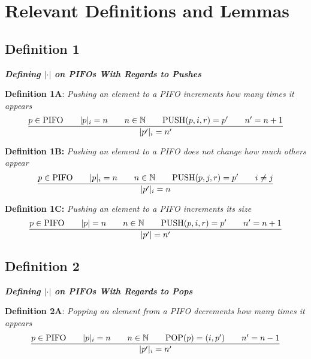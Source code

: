 \documentclass{article}
\begin{document}
\section{Relevant Definitions and Lemmas}

\subsection{Definition 1}

\noindent \textbf{\textit{Defining $|\cdot|$ on PIFOs With Regards to Pushes}}

\hfill \break 

\noindent \textbf{Definition 1A}: \textit{Pushing an element to a PIFO increments how many times it appears}
 $$\frac{p \in \text{PIFO}  \hspace{0.7cm} |p|_i = n \hspace{0.7cm} n \in \mathbb{N} \hspace{0.7cm} \text{PUSH}(p, i, r) = p' \hspace{0.7cm} n' = n+1}{|p'|_i = n'}$$

\noindent \textbf{Definition 1B:} \textit{Pushing an element to a PIFO does not change how much others appear}
$$\frac{p \in \text{PIFO}  \hspace{0.7cm} |p|_i = n \hspace{0.7cm} n \in \mathbb{N} \hspace{0.7cm} \text{PUSH}(p, j, r) = p' \hspace{0.7cm} i \neq j}{|p'|_i = n}$$

\noindent \textbf{Definition 1C:} \textit{Pushing an element to a PIFO increments its size}
$$\frac{p \in \text{PIFO}  \hspace{0.7cm} |p| = n \hspace{0.7cm} n \in \mathbb{N} \hspace{0.7cm} \text{PUSH}(p, i, r) = p' \hspace{0.7cm} n' = n+1}{|p'| = n'}$$\newline

\subsection{Definition 2}
\noindent \textbf{\textit{Defining $|\cdot|$ on PIFOs With Regards to Pops}}

\hfill\break

\noindent \textbf{Definition 2A}: \textit{Popping an element from a PIFO decrements how many times it appears}
 $$\frac{p \in \text{PIFO}  \hspace{0.7cm} |p|_i = n \hspace{0.7cm} n \in \mathbb{N} \hspace{0.7cm} \text{POP}(p) = (i, p') \hspace{0.7cm} n' = n-1}{|p'|_i = n'}$$
\end{document}
